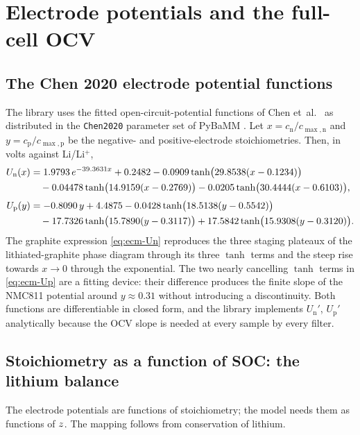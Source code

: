 \section{Electrode potentials and the full-cell OCV}
\label{sec:ecm-ocv}

\subsection{The Chen 2020 electrode potential functions}
The library uses the fitted open-circuit-potential functions of
Chen et~al.~\cite{chen2020parameterization} as distributed in the \texttt{Chen2020} parameter set
of PyBaMM \cite{sulzer2021pybamm}. Let $x = c_{\mathrm{n}}/c_{\max,\mathrm{n}}$ and
$y = c_{\mathrm{p}}/c_{\max,\mathrm{p}}$ be the negative- and positive-electrode
stoichiometries. Then, in volts against Li/Li$^+$,
\begin{align}
U_{\mathrm{n}}(x) &= 1.9793\,e^{-39.3631x} + 0.2482
 - 0.0909\tanh\!\big(29.8538(x-0.1234)\big) \notag\\
 &\quad - 0.04478\tanh\!\big(14.9159(x-0.2769)\big)
       - 0.0205\tanh\!\big(30.4444(x-0.6103)\big),
\label{eq:ecm-Un}\\[1mm]
U_{\mathrm{p}}(y) &= -0.8090\,y + 4.4875
 - 0.0428\tanh\!\big(18.5138(y-0.5542)\big) \notag\\
 &\quad - 17.7326\tanh\!\big(15.7890(y-0.3117)\big)
       + 17.5842\tanh\!\big(15.9308(y-0.3120)\big).
\label{eq:ecm-Up}
\end{align}
The graphite expression \eqref{eq:ecm-Un} reproduces the three staging plateaux of the
lithiated-graphite phase diagram through its three $\tanh$ terms and the steep rise towards
$x\to 0$ through the exponential. The two nearly cancelling $\tanh$ terms in \eqref{eq:ecm-Up}
are a fitting device: their difference produces the finite slope of the NMC811 potential around
$y\approx 0.31$ without introducing a discontinuity. Both functions are differentiable in closed
form, and the library implements $U_{\mathrm{n}}'$, $U_{\mathrm{p}}'$ analytically because the
OCV slope is needed at every sample by every filter.

\subsection{Stoichiometry as a function of SOC: the lithium balance}
The electrode potentials are functions of stoichiometry; the model needs them as functions of
$z$. The mapping follows from conservation of lithium.

